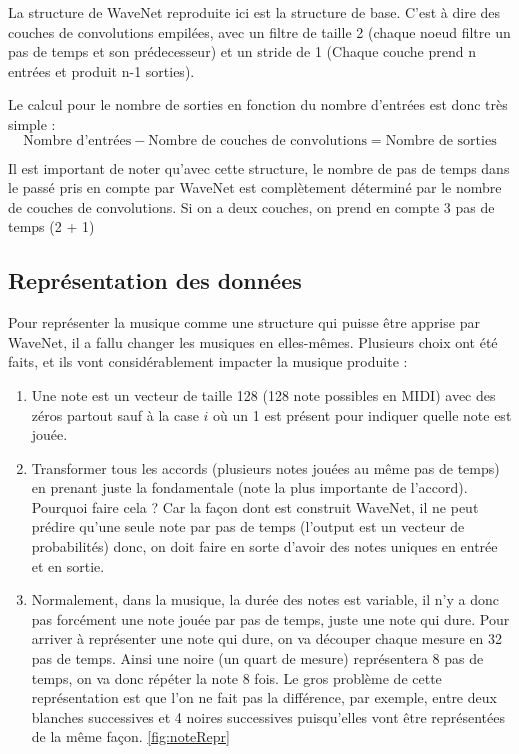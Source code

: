 \documentclass[a4paper]{article}
\begin{document}
La structure de WaveNet reproduite ici est la structure de base. C'est à dire des couches de convolutions empilées, avec un filtre de taille 2 (chaque noeud filtre un pas de temps et son prédecesseur) et un stride de 1 (Chaque couche prend n entrées et produit n-1 sorties).

Le calcul pour le nombre de sorties en fonction du nombre d'entrées est donc très simple :
$$\textrm{Nombre d'entrées} - \textrm{Nombre de couches de convolutions} = \textrm{Nombre de sorties}$$

Il est important de noter qu'avec cette structure, le nombre de pas de temps dans le passé pris en compte par WaveNet est complètement déterminé par le nombre de couches de convolutions. Si on a deux couches, on prend en compte 3 pas de temps (2 + 1)

\subsection{Représentation des données}

Pour représenter la musique comme une structure qui puisse être apprise par WaveNet, il a fallu changer les musiques en elles-mêmes. Plusieurs choix ont été faits, et ils vont considérablement impacter la musique produite :
\begin{enumerate}
\item Une note est un vecteur de taille 128 (128 note possibles en MIDI) avec des zéros partout sauf à la case $i$ où un 1 est présent pour indiquer quelle note est jouée.
\item Transformer tous les accords (plusieurs notes jouées au même pas de temps) en prenant juste la fondamentale (note la plus importante de l'accord). Pourquoi faire cela ? Car la façon dont est construit WaveNet, il ne peut prédire qu'une seule note par pas de temps (l'output est un vecteur de probabilités) donc, on doit faire en sorte d'avoir des notes uniques en entrée et en sortie.
\item Normalement, dans la musique, la durée des notes est variable, il n'y a donc pas forcément une note jouée par pas de temps, juste une note qui dure. Pour arriver à représenter une note qui dure, on va découper chaque mesure en 32 pas de temps. Ainsi une noire (un quart de mesure) représentera 8 pas de temps, on va donc répéter la note 8 fois. Le gros problème de cette représentation est que l'on ne fait pas la différence, par exemple, entre deux blanches successives et 4 noires successives puisqu'elles vont être représentées de la même façon. \autoref{fig:noteRepr}
\end{enumerate}
\end{document}
